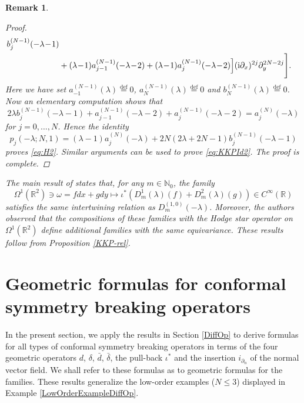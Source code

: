\documentclass[a4paper,12pt,reqno]{amsart}
\newtheorem{bem}[theorem]{Remark}
\numberwithin{theorem}{subsection}
\numberwithin{equation}{section}
\begin{document}
\begin{bem}
\begin{proof}
\begin{align*}
   b_j^{(N-1)}(-\lambda\!-\!1)\\
   & + (\lambda\!-\!1) a_{j-1}^{(N-1)}(-\lambda\!-\!2) + (\lambda\!-\!1)a_j^{(N-1)}(-\lambda\!-\!2)\Big]
   ({\rm i}\partial_x)^{2j} \partial_y^{2N-2j}\Bigg].
\end{align*}
Here we have set $a_{-1}^{(N-1)}(\lambda) {\stackrel{\text{def}}{=}} 0$, $a_{N}^{(N-1)}(\lambda) {\stackrel{\text{def}}{=}}
0$ and $b_{N}^{(N-1)}(\lambda) {\stackrel{\text{def}}{=}} 0$. Now an elementary computation shows that
\begin{equation*}
   2\lambda b_j^{(N-1)}(-\lambda\!-\!1) + a_{j-1}^{(N-1)}(-\lambda\!-\!2) +
   a_j^{(N-1)}(-\lambda\!-\!2) = a^{(N)}_j(-\lambda)
\end{equation*}
for $j=0,\ldots,N$. Hence the identity
\begin{equation*}
   p_j(-\lambda;N,1) = (\lambda\!-\!1) a_j^{(N)}(-\lambda) + 2N(2\lambda\!+\!2N\!-\!1) b^{(N-1)}_j(-\lambda\!-\!1)
\end{equation*}
proves \eqref{eq:H2}. Similar arguments can be used to prove \eqref{eq:KKPId2}.
The proof is complete.
\end{proof}

The main result of \cite{KKP} states that, for any $m \in {\mathbb{N}}_0$, the family
$$
   \Omega^1({\mathbb{R}}^2) \ni \omega = f dx + g dy
   \mapsto \iota^* (D^1_{m}(\lambda)(f) + D^2_{m}(\lambda)(g)) \in C^\infty({\mathbb{R}})
$$
satisfies the same intertwining relation as $D_m^{(1,0)}(-\lambda)$. Moreover,
the authors observed that the compositions of these families with the Hodge
star operator on $\Omega^1({\mathbb{R}}^2)$ define additional families with the same
equivariance. These results follow from Proposition \ref{KKP-rel}.
\end{bem}

\section{Geometric formulas for conformal symmetry breaking operators}\label{geometric}

In the present section, we apply the results in Section \ref{DiffOp} to derive
formulas for all types of conformal symmetry breaking operators in terms of the
four geometric operators ${d}$, $\delta$, $\bar{d}$, $\bar{\delta}$, the
pull-back $\iota^*$ and the insertion $i_{\partial_n}$ of the normal vector
field. We shall refer to these formulas as to geometric formulas for the
families. These results generalize the low-order examples ($N \le 3$) displayed
in Example \ref{LowOrderExampleDiffOp}.
\end{document}
